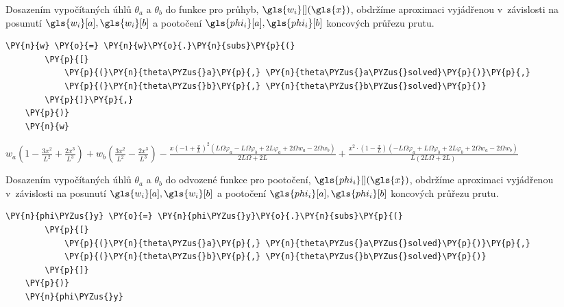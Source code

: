 \vspace{0.3cm}
Dosazením vypočítaných úhlů $\theta_a$ a $\theta_b$ do funkce pro průhyb, $\gls{w_i}[ ](\gls{x})$, obdržíme aproximaci vyjádřenou v~závislosti na posunutí $\gls{w_i}[a], \gls{w_i}[b]$ a pootočení $\gls{phi_i}[a], \gls{phi_i}[b]$ koncových průřezu prutu.

\begin{tcolorbox}[breakable, size=fbox, boxrule=1pt, pad at break*=1mm,colback=cellbackground, colframe=cellborder]
    \begin{Verbatim}[commandchars=\\\{\}]
    \PY{n}{w} \PY{o}{=} \PY{n}{w}\PY{o}{.}\PY{n}{subs}\PY{p}{(}
        \PY{p}{[}
            \PY{p}{(}\PY{n}{theta\PYZus{}a}\PY{p}{,} \PY{n}{theta\PYZus{}a\PYZus{}solved}\PY{p}{)}\PY{p}{,}
            \PY{p}{(}\PY{n}{theta\PYZus{}b}\PY{p}{,} \PY{n}{theta\PYZus{}b\PYZus{}solved}\PY{p}{)}
        \PY{p}{]}\PY{p}{,}
    \PY{p}{)}
    \PY{n}{w}
    \end{Verbatim}
\end{tcolorbox}
     
                
    
    $\displaystyle w_{a} \left(1 - \frac{3 x^{2}}{L^{2}} + \frac{2 x^{3}}{L^{3}}\right) + w_{b} \left(\frac{3 x^{2}}{L^{2}} - \frac{2 x^{3}}{L^{3}}\right) - \frac{x \left(-1 + \frac{x}{L}\right)^{2} \left(L \Omega \varphi_{a} - L \Omega \varphi_{b} + 2 L \varphi_{a} + 2 \Omega w_{a} - 2 \Omega w_{b}\right)}{2 L \Omega + 2 L} + \frac{x^{2} \cdot \left(1 - \frac{x}{L}\right) \left(- L \Omega \varphi_{a} + L \Omega \varphi_{b} + 2 L \varphi_{b} + 2 \Omega w_{a} - 2 \Omega w_{b}\right)}{L \left(2 L \Omega + 2 L\right)}$
    
\vspace{0.3cm}
Dosazením vypočítaných úhlů $\theta_a$ a $\theta_b$ do odvozené funkce pro pootočení, $\gls{phi_i}[ ](\gls{x})$, obdržíme aproximaci vyjádřenou v~závislosti na posunutí $\gls{w_i}[a], \gls{w_i}[b]$ a pootočení $\gls{phi_i}[a], \gls{phi_i}[b]$ koncových průřezu prutu.       

\begin{tcolorbox}[breakable, size=fbox, boxrule=1pt, pad at break*=1mm,colback=cellbackground, colframe=cellborder]
    \begin{Verbatim}[commandchars=\\\{\}]
    \PY{n}{phi\PYZus{}y} \PY{o}{=} \PY{n}{phi\PYZus{}y}\PY{o}{.}\PY{n}{subs}\PY{p}{(}
        \PY{p}{[}
            \PY{p}{(}\PY{n}{theta\PYZus{}a}\PY{p}{,} \PY{n}{theta\PYZus{}a\PYZus{}solved}\PY{p}{)}\PY{p}{,}
            \PY{p}{(}\PY{n}{theta\PYZus{}b}\PY{p}{,} \PY{n}{theta\PYZus{}b\PYZus{}solved}\PY{p}{)}
        \PY{p}{]}
    \PY{p}{)}
    \PY{n}{phi\PYZus{}y}
    \end{Verbatim}
\end{tcolorbox}
     
